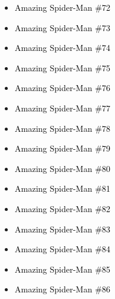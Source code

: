 \documentclass[12pt]{article}
\newcommand{\checkbox}{\raisebox{0.0ex}{\fbox{\rule{0ex}{1.5ex} \rule{1.5ex}{0ex}}}}
\begin{document}
\begin{center}
\begin{tcolorbox}[colback=white!95!gray, colframe=black, width=0.9\textwidth, arc=4mm, auto outer arc, boxrule=0.8pt]
\begin{itemize}[left=0pt,label={\checkbox}]
    \item \textcolor{black}{Amazing Spider-Man \#72}
    \item \textcolor{black}{Amazing Spider-Man \#73}
    \item \textcolor{black}{Amazing Spider-Man \#74}
    \item \textcolor{black}{Amazing Spider-Man \#75}
    \item \textcolor{black}{Amazing Spider-Man \#76}
    \item \textcolor{black}{Amazing Spider-Man \#77}
    \item \textcolor{black}{Amazing Spider-Man \#78}
    \item \textcolor{black}{Amazing Spider-Man \#79}
    \item \textcolor{black}{Amazing Spider-Man \#80}
    \item \textcolor{black}{Amazing Spider-Man \#81}
    \item \textcolor{black}{Amazing Spider-Man \#82}
    \item \textcolor{black}{Amazing Spider-Man \#83}
    \item \textcolor{black}{Amazing Spider-Man \#84}
    \item \textcolor{black}{Amazing Spider-Man \#85}
    \item \textcolor{black}{Amazing Spider-Man \#86}
\end{itemize}
\end{tcolorbox}
\end{center}
\end{document}
